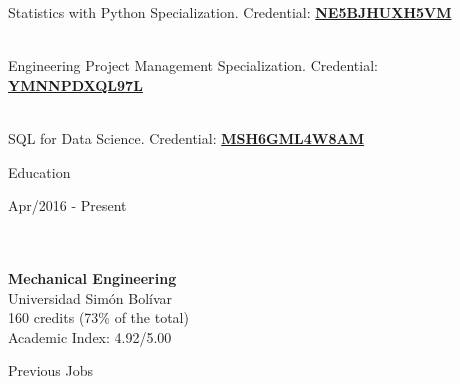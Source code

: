 \documentclass[10pt]{article}
\begin{document}
\begin{multicols}{2}
\begin{vwcol}[widths={0.235,0.765}, sep=.8cm,rule=0pt,indent=0em,lines=9]
        Statistics with Python Specialization. Credential: \href{https://www.coursera.org/account/accomplishments/specialization/certificate/NE5BJHUXH5VM}{\textbf{NE5BJHUXH5VM}}\par\hfill\\
        Engineering Project Management Specialization. Credential: \href{https://www.coursera.org/account/accomplishments/specialization/certificate/YMNNPDXQL97L}{\textbf{YMNNPDXQL97L}}\par\hfill\\
        SQL for Data Science. Credential: \href{https://www.coursera.org/account/accomplishments/certificate/MSH6GML4W8AM}{\textbf{MSH6GML4W8AM}}\par\vspace{5px}
    \end{vwcol}
\end{multicols}

\begin{LARGE}
    \color{blue!50!black} Education\par
\end{LARGE}
\begin{multicols}{2}
     \begin{vwcol}[widths={0.4,0.6}, sep=.2cm,rule=0pt,indent=0em,lines=4]
    \hspace{5pt}Apr/2016 - Present\\
    \hfill\\
    \hfill\\
    \hfill\par
    \textbf{Mechanical Engineering}\\
    Universidad Simón Bolívar\\
    160 credits (73\% of the total)\\
    Academic Index: 4.92/5.00
    \end{vwcol}
\end{multicols}


\begin{LARGE}
    \color{blue!50!black} Previous Jobs\par
\end{LARGE}
\end{document}
